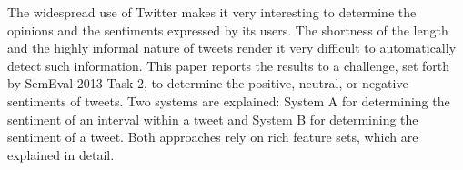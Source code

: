 The widespread use of Twitter makes it very interesting to determine the opinions and the sentiments expressed by its users. The shortness of the length
 and the highly informal nature of tweets render it very difficult to
 automatically detect such information. This paper reports the results to a
 challenge, set forth by SemEval-2013 Task 2,  to determine the positive,
 neutral, or negative sentiments of tweets. Two systems are explained:  System A
 for determining the sentiment of an interval within a tweet and System B for
 determining the sentiment of a tweet. Both approaches rely on rich feature
 sets, which are explained in detail.

